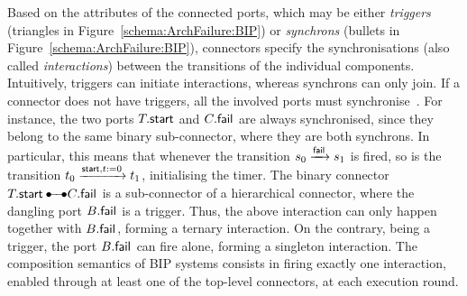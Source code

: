 \documentclass[smallcondensed]{svjour3}
\newcommand{\mdash}{---}
\newcommand{\goesto}[2][]{\ensuremath{\xrightarrow[#1]{#2}}}
\begin{document}
Based on the
attributes of the connected ports, which may be
either \emph{triggers} (triangles in Figure~\ref{schema:ArchFailure:BIP})
or \emph{synchrons} (bullets in Figure~\ref{schema:ArchFailure:BIP}),
%
connectors specify the synchronisations (also called
\emph{interactions}) between the transitions of the individual
components.  Intuitively, triggers can initiate interactions, whereas
synchrons can only join.  If a connector does not have triggers, all
the involved ports must synchronise~\cite{BliSif08-acp-tc}.
%
For instance, the two ports $T_{}.\mathsf{start}$ and
$C_{}.\mathsf{fail}_{}$ are always synchronised, since they belong to
the same binary sub-connector, where they are both synchrons.  In
particular, this means that whenever the transition 
$\cstate{0} \goesto{\PortFail} \cstate{1}$ is fired, so is the transition
$\tstate{0} \goesto{\PortStart, t:=0} \tstate{1}$,
initialising the timer.  The binary connector $\NameTimer.\PortStart
\bullet\!\!\!-\!\!\!-\!\!\!\bullet \NameCtrl.\PortFail$ is a
sub-connector of a hierarchical connector, where the dangling port
$B.\mathsf{fail}_{}$ is a trigger.  Thus, the above interaction can
only happen together with $B.\mathsf{fail}_{}$, forming a
ternary interaction.  On the contrary, being a trigger, the port
$B.\mathsf{fail}_{}$ can fire alone, forming a singleton
interaction.  The composition semantics of BIP systems consists in
firing exactly one interaction, enabled through at least one of the
top-level connectors, at each execution round.

\end{document}
